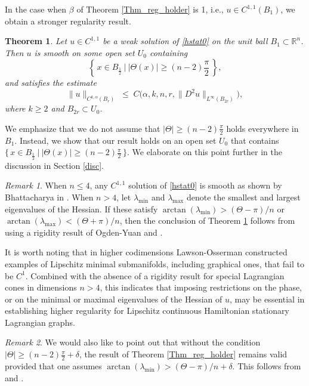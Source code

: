 \documentclass[12pt,reqno]{amsart}%
\newtheorem{theorem}{Theorem}[section]
\theoremstyle{plain}
\numberwithin{equation}{section}
\theoremstyle{definition}
\theoremstyle{remark}
\newtheorem{remark}{Remark}[section]
\begin{document}
 In the case when $\beta$ of Theorem \ref{Thm_reg_holder} is 1, i.e., $u\in C^{1,1}(B_1)$, we obtain a stronger regularity result.

\begin{theorem}\label{Thm_reg_Lipschitz}
Let  $u \in C^{1,1}$ be a weak solution of \eqref{hstat0} on the unit ball $B_1 \subset \mathbb{R}^n$. Then $u$ is smooth on some open set $U_0$ containing 
\[
  \left  \{\, x \in B_{\frac12} \: \vert \: |\Theta(x)| \geq (n-2)\frac{\pi}{2} \,\right \},
\]
and satisfies the estimate
\begin{equation*}
   \|u\|_{C^{k,\alpha}(B_r)} \;\leq\; C\big(\alpha, k, n, r, \|D^2 u\|_{L^\infty(B_{2r})}\big),
\end{equation*}
where $k \geq 2$ and $B_{2r} \subset U_0$.
\end{theorem}

We emphasize that we do not assume that $|\Theta| \geq (n-2)\frac{\pi}{2}$ holds everywhere in $B_1$. Instead, we show that our result holds on an open set $U_0$ that contains
$\{\, x \in B_{\frac12} \: \vert \: |\Theta(x)| \geq (n-2)\frac{\pi}{2}\,\}$. We elaborate on this point further in the discussion in Section \ref{disc}.
\begin{remark}
    When $n\leq 4$, any $C^{1,1}$ solution of \eqref{hstat0} is smooth as shown by Bhattacharya in \cite{AB2025}. When $n > 4$, let $\lambda_{\min}$ and $\lambda_{\max}$ denote the smallest and largest eigenvalues of the Hessian. If these satisfy $\arctan(\lambda_{\min}) > (\Theta-\pi)/n$ or $\arctan(\lambda_{\max}) < (\Theta+\pi)/n$, then the conclusion of Theorem \ref{Thm_reg_Lipschitz} follows  from using a rigidity result of Ogden-Yuan \cite[Corollary 1.1]{OY} and \cite{AB2025}.
    
    
    
    
    It is worth noting that in higher codimensions Lawson-Osserman \cite{LO} constructed examples of Lipschitz minimal submanifolds, including graphical ones, that fail to be $C^{1}$. Combined with the absence of a rigidity result for special Lagrangian cones in dimensions $n>4$, this indicates that imposing restrictions on the phase, or on the minimal or maximal eigenvalues of the Hessian of $u$, may be essential in establishing higher regularity for Lipschitz continuous Hamiltonian stationary Lagrangian graphs.
\end{remark}


\begin{remark}
    We would also like to point out that without the condition $|\Theta| \geq (n-2)\frac{\pi}{2}+\delta$, the result of Theorem \ref{Thm_reg_holder} remains valid provided that one assumes $\arctan(\lambda_{\min}) > (\Theta-\pi)/n+\delta$. This follows from \cite{OY} and \cite{AB2025}. 
\end{remark}
\end{document}
